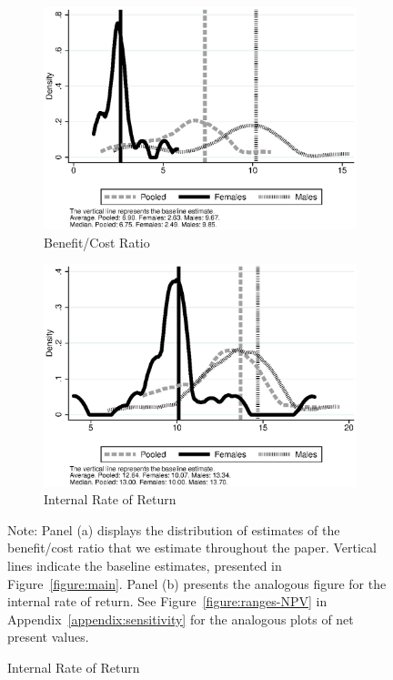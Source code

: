 \begin{figure}
\centering
\caption{Distribution of Benefit/Cost and Internal Rate of Return Estimates}\label{figure:ranges}
\begin{subfigure}[h]{0.49\textwidth}
	\centering
	\caption{Benefit/Cost Ratio} \label{fig:bc}
	\includegraphics[width=\textwidth]{output/overalldist_BCRatio}
\end{subfigure}
\begin{subfigure}[h]{0.49\textwidth}
	\centering
	\caption{Internal Rate of Return} \label{fig:irr}
	\includegraphics[width=\textwidth]{output/overalldist_IRR}
\end{subfigure}%
\footnotesize \justify
Note: Panel (a) displays the distribution of estimates of the benefit/cost ratio that we estimate throughout the paper. Vertical lines indicate the baseline estimates, presented in Figure~\ref{figure:main}. Panel (b) presents the analogous figure for the internal rate of return. See Figure~\ref{figure:ranges-NPV} in Appendix~\ref{appendix:sensitivity} for the analogous plots of net present values.
\end{figure}

